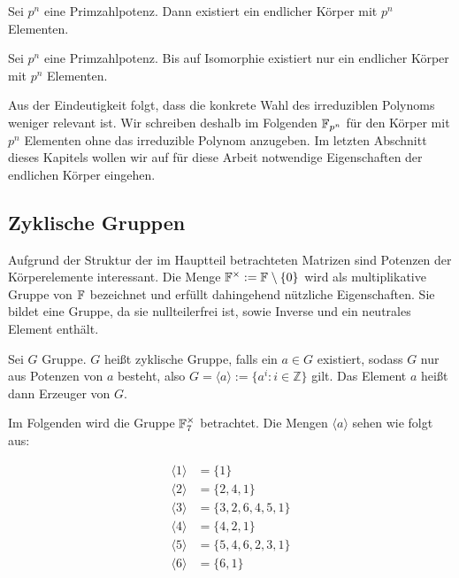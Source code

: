 \begin{satz}[Existenzsatz]
    Sei $p^n$ eine Primzahlpotenz. Dann existiert ein endlicher Körper mit $p^n$ Elementen. 
\end{satz}

\begin{satz}[Eindeutigkeitssatz]
    Sei $p^n$ eine Primzahlpotenz. Bis auf Isomorphie existiert nur ein endlicher Körper mit $p^n$ Elementen.
\end{satz}

Aus der Eindeutigkeit folgt, dass die konkrete Wahl des irreduziblen Polynoms weniger relevant ist. Wir schreiben deshalb im Folgenden $\field{p}[n]$ für den Körper mit $p^n$ Elementen ohne das irreduzible Polynom anzugeben. Im letzten Abschnitt dieses Kapitels wollen wir auf für diese Arbeit notwendige Eigenschaften der endlichen Körper eingehen.

\subsection{Zyklische Gruppen}

Aufgrund der Struktur der im Hauptteil betrachteten Matrizen sind Potenzen der Körperelemente interessant. Die Menge $\field{}^\times := \field{} \setminus \{0\}$ wird als multiplikative Gruppe von $\field{}$ bezeichnet und erfüllt dahingehend nützliche Eigenschaften. Sie bildet eine Gruppe, da sie nullteilerfrei ist, sowie Inverse und ein neutrales Element enthält.

\begin{definition}
    Sei $G$ Gruppe. $G$ heißt zyklische Gruppe, falls ein $a \in G$ existiert, sodass $G$ nur aus Potenzen von $a$ besteht, also $G = \langle a \rangle := \{ a^i : i \in \mathbb{Z}\}$ gilt. Das Element $a$ heißt dann Erzeuger von $G$.
\end{definition}

Im Folgenden wird die Gruppe $\field{7}^\times$ betrachtet. Die Mengen $\langle a \rangle$ sehen wie folgt aus:

\begin{align*}
    \langle 1 \rangle &= \{ 1\} \\
    \langle 2 \rangle &= \{ 2,4,1\} \\
    \langle 3 \rangle &= \{ 3,2,6,4,5,1\} \\
    \langle 4 \rangle &= \{ 4,2,1\} \\
    \langle 5 \rangle &= \{ 5,4,6,2,3,1\} \\
    \langle 6 \rangle &= \{ 6,1\} \\
\end{align*}

